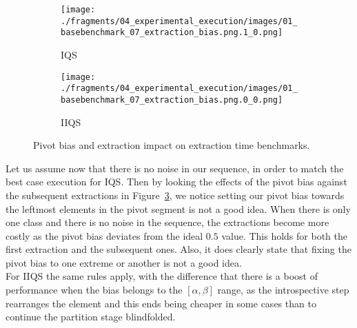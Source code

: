 \begin{figure}
    \centering
    \begin{subfigure}[b]{0.45\textwidth}
        \centering
        \texttt{[image: ./fragments/04\_experimental\_execution/images/01\_basebenchmark\_07\_extraction\_bias.png.1\_0.png]}
        \caption{IQS}
        \label{FIG:BENCHMARK_07_NOISE_BIAS__0_0}
    \end{subfigure}
    \hfill
    \begin{subfigure}[b]{0.45\textwidth}
        \centering
        \texttt{[image: ./fragments/04\_experimental\_execution/images/01\_basebenchmark\_07\_extraction\_bias.png.0\_0.png]}
        \caption{IIQS}
        \label{FIG:BENCHMARK_07_NOISE_BIAS__0_1}
    \end{subfigure}

    \caption{Pivot bias and extraction impact on extraction time benchmarks.}
    \label{FIG:BENCHMARK_07_NOISE_BIAS}
\end{figure}


Let us assume now that there is no noise in our sequence, in order to match the best case execution for IQS. Then by looking the effects of the pivot bias against the subsequent extractions in Figure~\ref{FIG:BENCHMARK_07_NOISE_BIAS}, we notice setting our pivot bias towards the leftmost elements in the pivot segment is not a good idea. When there is only one class and there is no noise in the sequence, the extractions become more costly as the pivot bias deviates from the ideal $0.5$ value. This holds for both the first extraction and the subsequent ones. Also, it does clearly state that fixing the pivot bias to one extreme or another is not a good idea. \\

For IIQS the same rules apply, with the difference that there is a boost of performance when the bias belongs to the $[\alpha,\beta]$ range, as the introspective step rearranges the element and this ends being cheaper in some cases than to continue the partition stage blindfolded.\\

\FloatBarrier